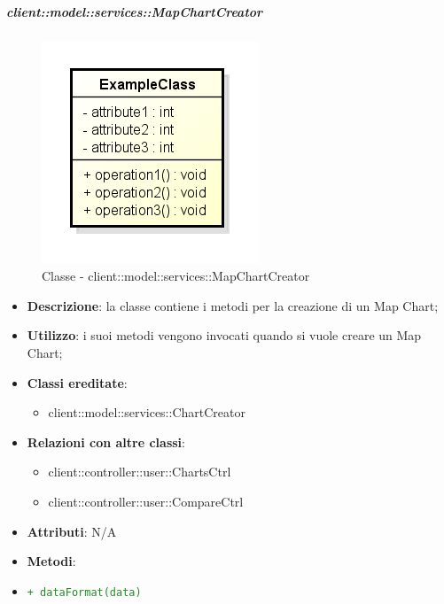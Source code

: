		\subparagraph{client::model::services::MapChartCreator} %
		\label{subp:mapchartcreator}
			\begin{figure}[htbp]
				\centering
				\centerline{\includegraphics[scale=0.7]{./images/client/classes/example_class.png}}
				\caption{Classe - client::model::services::MapChartCreator}
			\end{figure}
			\begin{itemize}
				\item \textbf{Descrizione}: la classe contiene i metodi per la creazione di un Map Chart;
				\item \textbf{Utilizzo}: i suoi metodi vengono invocati quando si vuole creare un Map Chart;
				\item \textbf{Classi ereditate}:
					\begin{itemize}
						\item client::model::services::ChartCreator
					\end{itemize}
				\item \textbf{Relazioni con altre classi}:
					\begin{itemize}
						\item client::controller::user::ChartsCtrl
						\item client::controller::user::CompareCtrl
					\end{itemize}
				\item \textbf{Attributi}: N/A
				\item \textbf{Metodi}: 
					\item \textcolor{forestgreen}{\texttt{+ dataFormat(data)}}
			\end{itemize}

